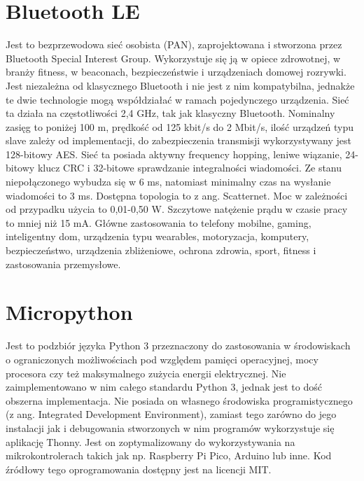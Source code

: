 \section{Bluetooth LE}
Jest to bezprzewodowa sieć osobista (PAN), zaprojektowana i stworzona przez Bluetooth Special Interest Group. Wykorzystuje się ją w opiece zdrowotnej, w branży fitness, w beaconach, bezpieczeństwie i urządzeniach domowej rozrywki. Jest niezależna od klasycznego Bluetooth i nie jest z nim kompatybilna, jednakże te dwie technologie mogą współdziałać w ramach pojedynczego urządzenia.
Sieć ta działa na częstotliwości 2,4 GHz, tak jak klasyczny Bluetooth.
Nominalny zasięg to poniżej 100 m, prędkość od 125 kbit/s do 2 Mbit/s, ilość urządzeń typu slave zależy od implementacji, do zabezpieczenia transmisji wykorzystywany jest 128-bitowy AES.
Sieć ta posiada aktywny frequency hopping, leniwe wiązanie, 24-bitowy klucz CRC i 32-bitowe sprawdzanie integralności wiadomości.
Ze stanu niepołączonego wybudza się w 6 ms, natomiast minimalny czas na wysłanie wiadomości to 3 ms.
Dostępna topologia to z ang. Scatternet.
Moc w zależności od przypadku użycia to 0,01-0,50 W.
Szczytowe natężenie prądu w czasie pracy to mniej niż 15 mA.
Główne zastosowania to telefony mobilne, gaming, inteligentny dom, urządzenia typu wearables, motoryzacja, komputery, bezpieczeństwo, urządzenia zbliżeniowe, ochrona zdrowia, sport, fitness i zastosowania przemysłowe\cite{Wikipedia:ble:2024}.
\section{Micropython}
Jest to podzbiór języka Python 3 przeznaczony do zastosowania w środowiskach o ograniczonych możliwościach pod względem pamięci operacyjnej, mocy procesora czy też maksymalnego zużycia energii elektrycznej. Nie zaimplementowano w nim całego standardu Python 3, jednak jest to dość obszerna implementacja. Nie posiada on własnego środowiska programistycznego (z ang. Integrated Development Environment), zamiast tego zarówno do jego instalacji jak i debugowania stworzonych w nim programów wykorzystuje się aplikację Thonny.
Jest on zoptymalizowany do wykorzystywania na mikrokontrolerach takich jak np. Raspberry Pi Pico, Arduino lub inne.
Kod źródłowy tego oprogramowania dostępny jest na licencji MIT.\cite{wiki:micropython:2024}